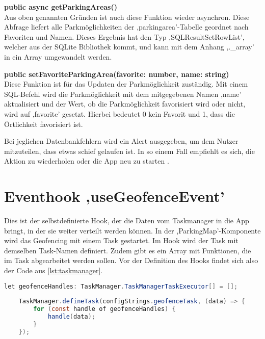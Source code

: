 \begin{description}
	\item \textbf{public async getParkingAreas()} \\ Aus oben genannten Gründen ist auch diese Funktion wieder asynchron. Diese Abfrage liefert alle Parkmöglichkeiten der ,parkingarea'-Tabelle geordnet nach Favoriten und Namen. Dieses Ergebnis hat den Typ ,SQLResultSetRowList', welcher aus der SQLite Bibliothek kommt, und kann mit dem Anhang ,.\_array' in ein Array umgewandelt werden.
	\item \textbf{public setFavoriteParkingArea(favorite: number, name: string)} \\ Diese Funktion ist für das Updaten der Parkmöglichkeit zuständig. Mit einem SQL-Befehl wird die Parkmöglichkeit mit dem mitgegebenen Namen ,name' aktualisiert und der Wert, ob die Parkmöglichkeit favorisiert wird oder nicht, wird auf ,favorite' gesetzt. Hierbei bedeutet 0 kein Favorit und 1, dass die Örtlichkeit favorisiert ist.
\end{description}

Bei jeglichen Datenbankfehlern wird ein Alert ausgegeben, um dem Nutzer mitzuteilen, dass etwas schief gelaufen ist. In so einem Fall empfiehlt es sich, die Aktion zu wiederholen oder die App neu zu starten \cite{sqlite}.

\section{Eventhook ,useGeofenceEvent'}
\label{geofenceEvent}
Dies ist der selbstdefinierte Hook, der die Daten vom Taskmanager in die App bringt, in der sie weiter verteilt werden können. In der ,ParkingMap'-Komponente wird das Geofencing mit einem Task gestartet. Im Hook wird der Task mit demselben Task-Namen definiert. Zudem gibt es ein Array mit Funktionen, die im Task abgearbeitet werden sollen. Vor der Definition des Hooks findet sich also der Code aus \autoref{lst:taskmanager}.

\begin{lstlisting}[caption={Dieser Code befindet sich vor der Definition des Eventhooks. Hier wird ein Array angelegt, welches Funktionen beinhaltet. Diese werden dann ab Zeile 11 im definierten Task abgearbeitet. (Quelle: Eigene Implementierung)},captionpos=b, language=Java, label=lst:taskmanager]
	let geofenceHandles: TaskManager.TaskManagerTaskExecutor[] = [];
	
	TaskManager.defineTask(configStrings.geofenceTask, (data) => {
		for (const handle of geofenceHandles) {
			handle(data);
		}
	});
\end{lstlisting}

